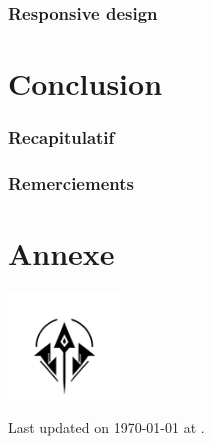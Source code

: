 \documentclass[12pt]{article}
\begin{document}
\subsubsection{Responsive design}




\newpage
\section{Conclusion}
\subsubsection{Recapitulatif}
\subsubsection{Remerciements}
% 

\section{Annexe}
\centering
\vspace*{1.8cm}
\includegraphics[width=3cm]{0.format/logo.png}

\vspace*{1cm}
Last updated on \today{} at \currenttime.
\end{document}
